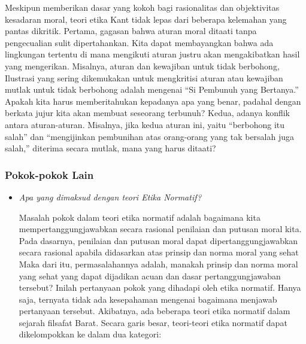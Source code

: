 \documentclass[10pt,a4paper]{article}
\begin{document}
\begin{multicols}{2}
Meskipun memberikan dasar yang kokoh bagi rasionalitas dan objektivitas
kesadaran moral, teori etika Kant tidak lepas dari beberapa kelemahan
yang pantas dikritik. Pertama, gagasan bahwa aturan moral ditaati tanpa
pengecualian sulit dipertahankan. Kita dapat membayangkan bahwa ada
lingkungan tertentu di mana mengikuti aturan justru akan mengakibatkan
hasil yang mengerikan. Misalnya, aturan dan kewajiban untuk tidak
berbohong, Ilustrasi yang sering dikemukakan untuk mengkritisi aturan
atau kewajiban mutlak untuk tidak berbohong adalah mengenai ``Si
Pembunuh yang Bertanya.'' Apakah kita harus memberitahukan kepadanya apa
yang benar, padahal dengan berkata jujur kita akan membuat seseorang
terbunuh? Kedua, adanya konflik antara aturan-aturan. Misalnya, jika
kedua aturan ini, yaitu ``berbohong itu salah'' dan ``mengijinkan
pembunihan atas orang-orang yang tak bersalah juga salah,'' diterima
secara mutlak, mana yang harus ditaati?

\hypertarget{pokok-pokok-lain-6}{%
\subsubsection{Pokok-pokok Lain}\label{pokok-pokok-lain-6}}

\begin{itemize}
\item
  \emph{Apa yang dimaksud dengan teori Etika Normatif?}

  Masalah pokok dalam teori etika normatif adalah bagaimana kita
  mempertanggungjawabkan secara rasional penilaian dan putusan moral
  kita. Pada dasarnya, penilaian dan putusan moral dapat
  dipertanggungjawabkan secara rasional apabila didasarkan atas prinsip
  dan norma moral yang sehat Maka dari itu, permasalahannya adalah,
  manakah prinsip dan norma moral yang sehat yang dapat dijadikan acuan
  dan dasar pertanggungjawaban tersebut? Inilah pertanyaan pokok yang
  dihadapi oleh etika normatif. Hanya saja, ternyata tidak ada
  kesepahaman mengenai bagaimana menjawab pertanyaan tersebut.
  Akibatnya, ada beberapa teori etika normatif dalam sejarah filsafat
  Barat. Secara garis besar, teori-teori etika normatif dapat
  dikelompokkan ke dalam dua kategori:


\end{itemize}
\end{multicols}
\end{document}
